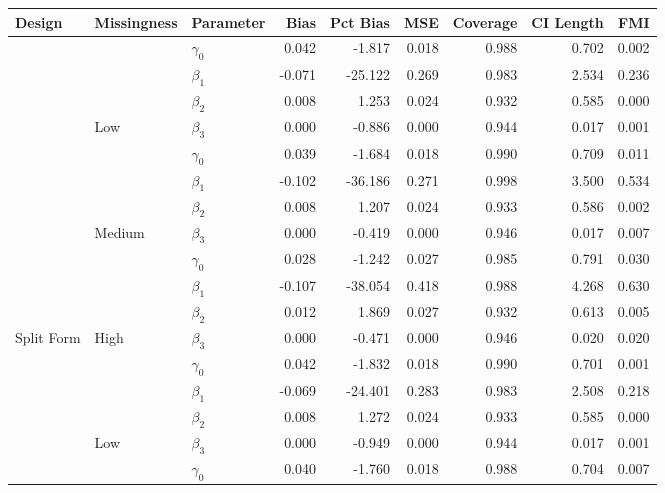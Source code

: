 \documentclass{svjour3}\usepackage[]{graphicx}\usepackage[]{color}
\newenvironment{knitrout}{}{} %
\begin{document}
\begin{knitrout}
\color{fgcolor}
\begin{tabular}{l|l|l|r|r|r|r|r|r}
\hline
Design & Missingness & Parameter & Bias & Pct Bias & MSE & Coverage & CI Length & FMI\\
\hline
 &  & $\gamma_0$ & 0.042 & -1.817 & 0.018 & 0.988 & 0.702 & 0.002\\
\cline{3-9}
 &  & $\beta_1$ & -0.071 & -25.122 & 0.269 & 0.983 & 2.534 & 0.236\\
\cline{3-9}
 &  & $\beta_2$ & 0.008 & 1.253 & 0.024 & 0.932 & 0.585 & 0.000\\
\cline{3-9}
 & \multirow{-4}{*}{\raggedright\arraybackslash Low} & $\beta_3$ & 0.000 & -0.886 & 0.000 & 0.944 & 0.017 & 0.001\\
\cline{2-9}
 &  & $\gamma_0$ & 0.039 & -1.684 & 0.018 & 0.990 & 0.709 & 0.011\\
\cline{3-9}
 &  & $\beta_1$ & -0.102 & -36.186 & 0.271 & 0.998 & 3.500 & 0.534\\
\cline{3-9}
 &  & $\beta_2$ & 0.008 & 1.207 & 0.024 & 0.933 & 0.586 & 0.002\\
\cline{3-9}
 & \multirow{-4}{*}{\raggedright\arraybackslash Medium} & $\beta_3$ & 0.000 & -0.419 & 0.000 & 0.946 & 0.017 & 0.007\\
\cline{2-9}
 &  & $\gamma_0$ & 0.028 & -1.242 & 0.027 & 0.985 & 0.791 & 0.030\\
\cline{3-9}
 &  & $\beta_1$ & -0.107 & -38.054 & 0.418 & 0.988 & 4.268 & 0.630\\
\cline{3-9}
 &  & $\beta_2$ & 0.012 & 1.869 & 0.027 & 0.932 & 0.613 & 0.005\\
\cline{3-9}
\multirow{-12}{*}{\raggedright\arraybackslash Split Form} & \multirow{-4}{*}{\raggedright\arraybackslash High} & $\beta_3$ & 0.000 & -0.471 & 0.000 & 0.946 & 0.020 & 0.020\\
\cline{1-9}
 &  & $\gamma_0$ & 0.042 & -1.832 & 0.018 & 0.990 & 0.701 & 0.001\\
\cline{3-9}
 &  & $\beta_1$ & -0.069 & -24.401 & 0.283 & 0.983 & 2.508 & 0.218\\
\cline{3-9}
 &  & $\beta_2$ & 0.008 & 1.272 & 0.024 & 0.933 & 0.585 & 0.000\\
\cline{3-9}
 & \multirow{-4}{*}{\raggedright\arraybackslash Low} & $\beta_3$ & 0.000 & -0.949 & 0.000 & 0.944 & 0.017 & 0.001\\
\cline{2-9}
 &  & $\gamma_0$ & 0.040 & -1.760 & 0.018 & 0.988 & 0.704 & 0.007\\

\end{tabular}
\end{knitrout}
\end{document}

